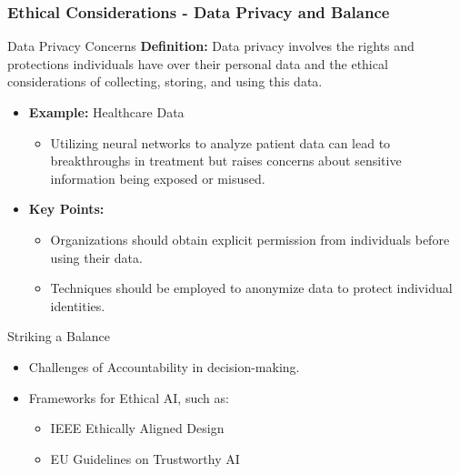 \documentclass{beamer}
\begin{document}
\begin{frame}[fragile]
    \frametitle{Ethical Considerations - Data Privacy and Balance}
    \begin{block}{Data Privacy Concerns}
        \textbf{Definition:} Data privacy involves the rights and protections individuals have over their personal data and the ethical considerations of collecting, storing, and using this data.
    \end{block}

    \begin{itemize}
        \item \textbf{Example:} Healthcare Data
              \begin{itemize}
                  \item Utilizing neural networks to analyze patient data can lead to breakthroughs in treatment but raises concerns about sensitive information being exposed or misused.
              \end{itemize}

        \item \textbf{Key Points:}
              \begin{itemize}
                  \item Organizations should obtain explicit permission from individuals before using their data.
                  \item Techniques should be employed to anonymize data to protect individual identities.
              \end{itemize}
    \end{itemize}

    \begin{block}{Striking a Balance}
        \begin{itemize}
            \item Challenges of Accountability in decision-making.
            \item Frameworks for Ethical AI, such as:
                  \begin{itemize}
                      \item IEEE Ethically Aligned Design
                      \item EU Guidelines on Trustworthy AI
                  \end{itemize}
        \end{itemize}
    \end{block}
\end{frame}
\end{document}
